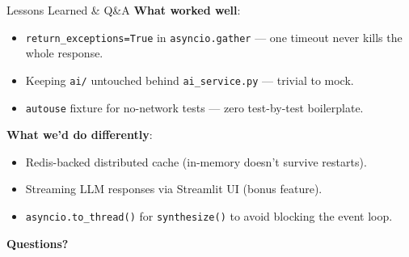 \documentclass[aspectratio=169]{beamer}
\begin{document}
\begin{frame}{Lessons Learned \& Q\&A}
\textbf{What worked well}:
\begin{itemize}
  \item \texttt{return\_exceptions=True} in \texttt{asyncio.gather} — one timeout
    never kills the whole response.
  \item Keeping \texttt{ai/} untouched behind \texttt{ai\_service.py} — trivial to mock.
  \item \texttt{autouse} fixture for no-network tests — zero test-by-test boilerplate.
\end{itemize}

\vspace{0.7em}
\textbf{What we'd do differently}:
\begin{itemize}
  \item Redis-backed distributed cache (in-memory doesn't survive restarts).
  \item Streaming LLM responses via Streamlit UI (bonus feature).
  \item \texttt{asyncio.to\_thread()} for \texttt{synthesize()} to avoid blocking the event loop.
\end{itemize}

\vspace{1em}
\begin{center}
  \Large \textbf{Questions?}
\end{center}
\end{frame}
\end{document}
